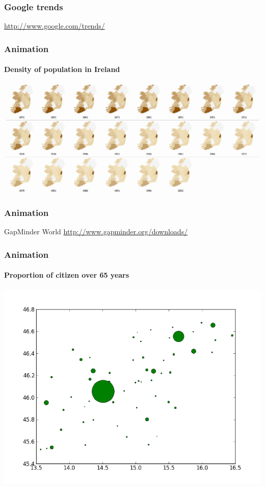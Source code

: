 \documentclass{beamer}
\begin{document}
 \begin{frame}
	\frametitle{Google trends}
	\url{http://www.google.com/trends/}
\end{frame} 

\begin{frame}
	\frametitle{Animation}
	\framesubtitle{Density of population in Ireland}
	\includegraphics[scale=0.4]{../img/irci-v-dublin.png}
\end{frame} 

\begin{frame}
	\frametitle{Animation}
		GapMinder World
		\url{http://www.gapminder.org/downloads/}
\end{frame} 

\begin{frame}
	\frametitle{Animation}
	\framesubtitle{Proportion of citizen over 65 years}
	\includegraphics[scale=0.5]{../results/65/prebivalstvo_1998H1.png}
\end{frame} 
\end{document}
